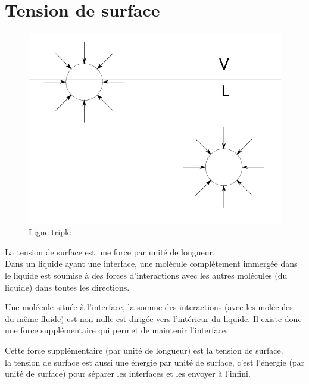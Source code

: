 \documentclass[french]{article}
\begin{document}
\section{Tension de surface}
\begin{figure}[ht]
	\centering
	\includegraphics[scale = 0.3]{./image/rondforces.png}
	\caption{Ligne triple}
\end{figure}
La tension de surface est une force par unité de longueur.\\ 

Dans un liquide ayant une interface, une molécule complètement immergée dans le liquide est soumise à des forces d'interactions avec les autres molécules (du liquide) dans toutes les directions. 

Une molécule située à l'interface, la somme des interactions (avec les molécules du même fluide) est non nulle est dirigée vers l'intérieur du liquide. Il existe donc une force supplémentaire qui permet de maintenir l'interface.

Cette force supplémentaire (par unité de longueur) est la tension de surface.\\



la tension de surface est aussi une énergie par unité de surface, c'est l'énergie (par unité de surface) pour séparer les interfaces et les envoyer à l'infini.
\end{document}

